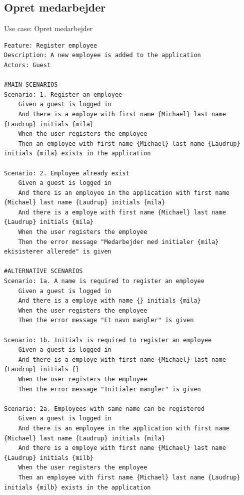 \subsection{Opret medarbejder}
\begin{listing}[H]
    \centering
    \caption{Use case: Opret medarbejder}\label{lst:usecase_register_employee}
    \begin{verbatim}  
Feature: Register employee
Description: A new employee is added to the application
Actors: Guest

#MAIN SCENARIOS
Scenario: 1. Register an employee
    Given a guest is logged in
    And there is a employe with first name {Michael} last name {Laudrup} initials {mila}  
    When the user registers the employee
    Then an employee with first name {Michael} last name {Laudrup} initials {mila} exists in the application

Scenario: 2. Employee already exist
    Given a guest is logged in
    And there is an employee in the application with first name {Michael} last name {Laudrup} initials {mila}
    And there is a employe with first name {Michael} last name {Laudrup} initials {mila}  
    When the user registers the employee
    Then the error message "Medarbejder med initialer {mila} ekisisterer allerede" is given

#ALTERNATIVE SCENARIOS
Scenario: 1a. A name is required to register an employee
    Given a guest is logged in
    And there is a employe with name {} initials {mila}  
    When the user registers the employee
    Then the error message "Et navn mangler" is given

Scenario: 1b. Initials is required to register an employee
    Given a guest is logged in
    And there is a employe with first name {Michael} last name {Laudrup} initials {}  
    When the user registers the employee
    Then the error message "Initialer mangler" is given

Scenario: 2a. Employees with same name can be registered
    Given a guest is logged in
    And there is an employee in the application with first name {Michael} last name {Laudrup} initials {mila}
    And there is a employe with first name {Michael} last name {Laudrup} initials {milb}  
    When the user registers the employee
    Then an employee with first name {Michael} last name {Laudrup} initials {milb} exists in the application

    \end{verbatim}
\end{listing}

